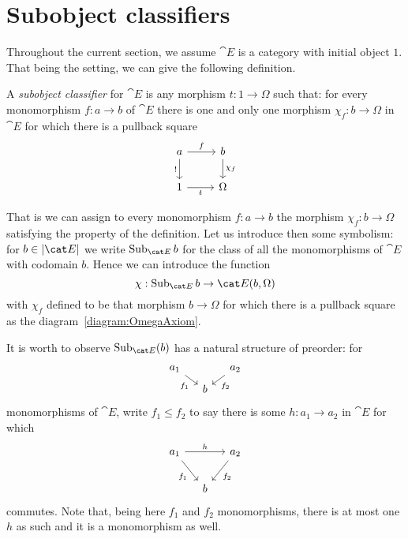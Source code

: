 
\section{Subobject classifiers}

Throughout the current section, we assume \(\cat E\) is a category with initial object \(1\). That being the setting, we can give the following definition.

\begin{definition}
A {\em subobject classifier} for \(\cat E\) is any morphism \(t : 1 \to \Omega\) such that:
for every monomorphism \(f : a \to b\) of \(\cat E\) there is one and only one morphism \(\chi_f : b \to \Omega\) in \(\cat E\) for which there is a pullback square
\begin{equation}\begin{tikzcd}
a \ar["{!}", d, swap] \ar["f", r] & b \ar["{\chi_f}", d] \\
1 \ar["t", r, swap] & \Omega
\end{tikzcd}\label{diagram:OmegaAxiom}\end{equation}
\end{definition}

That is we can assign to every monomorphism \(f : a \to b\) the morphism \(\chi_f : b \to \Omega\) satisfying the property of the definition. Let us introduce then some symbolism: for \(b \in \obj{\cat E}\) we write \(\subobjs_{\cat E} b\) for the class of all the monomorphisms of \(\cat E\) with codomain \(b\). Hence we can introduce the function
\[\chi : \subobjs_{\cat E} b \to \cat E (b, \Omega)\]
with \(\chi_f\) defined to be that morphism \(b \to \Omega\) for which there is a pullback square as the diagram~\eqref{diagram:OmegaAxiom}.

It is worth to observe \(\subobjs_{\cat E} (b)\) has a natural structure of preorder: for
\[\begin{tikzcd}[row sep=tiny, column sep=small]
a_1 \ar["{f_1}", dr, swap] & & a_2 \ar["{f_2}", dl] \\
& b 
\end{tikzcd}\]
monomorphisms of \(\cat E\), write \(f_1 \le f_2\) to say there is some \(h : a_1 \to a_2\) in \(\cat E\) for which
\[\begin{tikzcd}[column sep=small]
a_1 \ar["{f_1}", dr, swap] \ar["h", rr] & & a_2 \ar["{f_2}", dl] \\
& b 
\end{tikzcd}\]
commutes. Note that, being here \(f_1\) and \(f_2\) monomorphisms, there is at most one \(h\) as such and it is a monomorphism as well.

